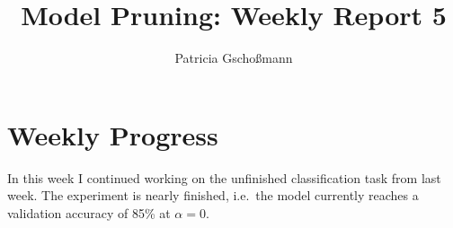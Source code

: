 \documentclass[10pt,twocolumn,letterpaper]{article}
\begin{document}
\title{Model Pruning: Weekly Report 5}
\author{Patricia Gschoßmann}

\maketitle

\section{Weekly Progress}
In this week I continued working on the unfinished classification task from last week.
The experiment is nearly finished, i.e.\ the model currently reaches a validation accuracy of 85\% at $\alpha=0$.
\end{document}
